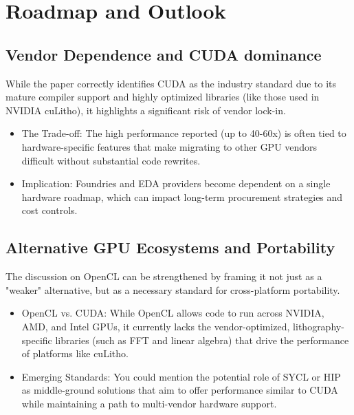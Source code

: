 \documentclass[pdflatex,sn-mathphys-num]{sn-jnl}%
\theoremstyle{thmstyleone}%
\theoremstyle{thmstyletwo}%
\theoremstyle{thmstylethree}%
\begin{document}
\section{Roadmap and Outlook}

\subsection{Vendor Dependence and CUDA dominance}
While the paper correctly identifies CUDA as the industry standard due to its mature compiler support and highly optimized libraries (like those used in NVIDIA cuLitho), it highlights a significant risk of vendor lock-in.
\begin{itemize}
  \item The Trade-off: The high performance reported (up to 40-60x) is often tied to hardware-specific features that make migrating to other GPU vendors difficult without substantial code rewrites.
  \item Implication: Foundries and EDA providers become dependent on a single hardware roadmap, which can impact long-term procurement strategies and cost controls.

\end{itemize}

\subsection{Alternative GPU Ecosystems and Portability}
The discussion on OpenCL can be strengthened by framing it not just as a "weaker" alternative, but as a necessary standard for cross-platform portability.
\begin{itemize}
  \item  OpenCL vs. CUDA: While OpenCL allows code to run across NVIDIA, AMD, and Intel GPUs, it currently lacks the vendor-optimized, lithography-specific libraries (such as FFT and linear algebra) that drive the performance of platforms like cuLitho.
  \item Emerging Standards: You could mention the potential role of SYCL or HIP as middle-ground solutions that aim to offer performance similar to CUDA while maintaining a path to multi-vendor hardware support.
\end{itemize}
\end{document}
